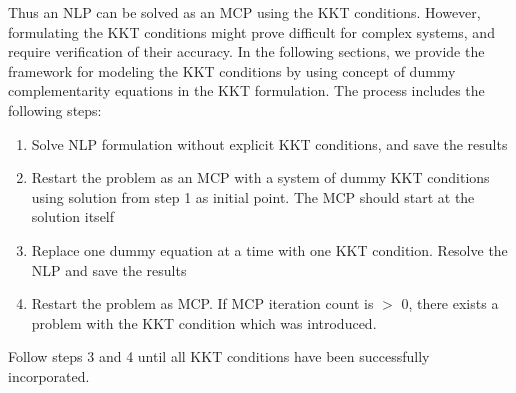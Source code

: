 \documentclass{article}
\begin{document}
\begin{comment}

\begin{equation}
\begin{aligned}
& \bigtriangledown{f(\hat{x})} - \sum_{i=1}^{m} u_{i} \bigtriangledown{g_{i}(\hat{x})}
			- \sum_{k=1}^{p} v_{i} \bigtriangledown{h_{k}(\hat{x})} - \sum_{l=1}^{q} w_{i} \bigtriangledown{d_{l}(\hat{x})} = 0  \\
\\
& h_{k}(\hat{x}) = 0   k = 1,2...p  \\
g_{i}(\hat{x}) \leq 0&	 i = 1,2...m \\  d_{l}(\hat{x}) \geq =0	&	l = 1,2...q
\\
and,\\
<u_{i},g_{i}(x)> = 0 \\ <v_{i},h_{k}(x)> =0 \\  <w_{l},d_{l}(x)> =0
\end{aligned}
\end{equation}

where $<u_{i},g_{i}(x)> = 0$  represent the complimentarily condition and variables u, v, and w represent the marginals of the respective constraint. It is often written as

 $g_{i}(x) \perp L \leq u \leq U $

where symbol $\perp $(referred to as perpendicular  to) indicates pair-wise complementarity between the function g() and variable u and its bounds. The complimentarity condition essentially

\end{comment}

\noindent Thus an NLP can be solved as an MCP using the KKT conditions. However, formulating the KKT conditions might prove difficult for complex systems, and require verification of their accuracy. In the following sections, we provide the framework for modeling the KKT conditions  by using concept of dummy complementarity equations in the KKT formulation. The process includes the following steps:

\begin{enumerate}
	\item Solve NLP formulation without explicit KKT conditions, and save the results
	\item	 Restart the problem as an MCP with a system of dummy KKT conditions using solution from step 1 as initial point. The MCP should start at the solution itself
	\item Replace one dummy equation at a time with one KKT condition. Resolve the NLP and save the results
	\item Restart the problem as MCP. If MCP iteration count is $>$ 0, there exists a problem with the KKT condition which was introduced.
\end{enumerate}
\noindent Follow steps 3 and 4 until all KKT conditions have been successfully incorporated.
\end{document}
